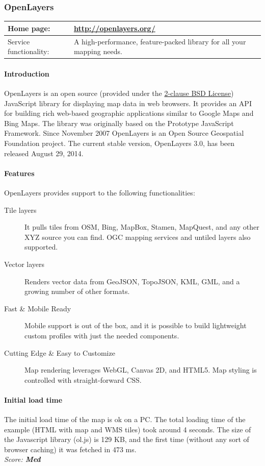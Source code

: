 \documentclass[11pt,a4paper,titlepage,oneside]{report}
\begin{document}
  \subsubsection{OpenLayers}
   \begin{tabular}{|p{4cm}|p{8cm}|}
     \hline
     Home page: & \url{http://openlayers.org/} \\
     \hline
     Service functionality: & A high-performance, feature-packed library for all your mapping needs. \\
     \hline
   \end{tabular}
   \paragraph{Introduction} \indent
   OpenLayers is an open source (provided under the \href{'https://tldrlegal.com/license/bsd-2-clause-license-(freebsd)'}{2-clause BSD License}) JavaScript library for displaying map data in web browsers. It provides an API for building rich web-based geographic applications similar to Google Maps and Bing Maps. The library was originally based on the Prototype JavaScript Framework. Since November 2007 OpenLayers is an Open Source Geospatial Foundation project.
   The current stable version, OpenLayers 3.0, has been released August 29, 2014.
   \paragraph{Features}
   OpenLayers provides support to the following functionalities:
   \begin{description}
     \item[Tile layers] It pulls tiles from OSM, Bing, MapBox, Stamen, MapQuest, and any other XYZ source you can find. \gls{OGC} mapping services and untiled layers also supported.
     \item[Vector layers] Renders vector data from GeoJSON, TopoJSON, KML, GML, and a growing number of other formats.
     \item[Fast \& Mobile Ready] Mobile support is out of the box, and it is possible to build lightweight custom profiles with just the needed components.
     \item[Cutting Edge \& Easy to Customize] Map rendering leverages WebGL, Canvas 2D, and \gls{HTML5}. Map styling is controlled with straight-forward \gls{CSS}.
   \end{description}
   \paragraph{Initial load time}
   The initial load time of the map is ok on a PC. The total loading time of the example (\gls{HTML} with map and \gls{WMS} tiles) took around 4 seconds. The size of the Javascript library (ol.js) is 129 KB, and the first time (without any sort of browser caching) it was fetched in 473 ms.
   \\ \emph{Score: \textbf{Med}}
\end{document}
